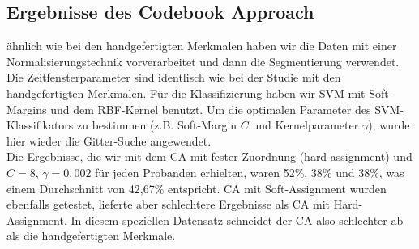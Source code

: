 \subsection{Ergebnisse des Codebook Approach} \label{ergebnisse-codebook-approach-subsec}


{\"a}hnlich wie bei den handgefertigten Merkmalen haben wir die Daten mit einer Normalisierungstechnik vorverarbeitet und dann die Segmentierung verwendet. Die Zeitfensterparameter sind identlisch wie bei der Studie mit den handgefertigten Merkmalen.
F{\"u}r die Klassifizierung haben wir SVM mit Soft-Margins und dem RBF-Kernel benutzt. 
Um die optimalen Parameter des SVM-Klassifikators zu bestimmen (z.B. Soft-Margin $C$ und Kernelparameter $\gamma$), wurde hier wieder die Gitter-Suche angewendet. \\


Die Ergebnisse, die wir mit dem CA mit fester Zuordnung (hard assignment) und $C = 8$, $\gamma = 0,002$ f{\"u}r jeden Probanden erhielten, waren 52\%, 38\% und 38\%, was einem Durchschnitt von 42,67\% entspricht. CA mit Soft-Assignment wurden ebenfalls getestet, lieferte aber schlechtere Ergebnisse als CA mit Hard-Assignment. In diesem speziellen Datensatz schneidet der CA also schlechter ab als die handgefertigten Merkmale.